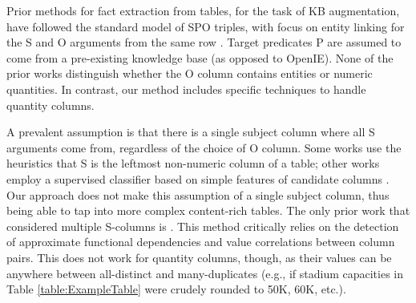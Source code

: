 %
Prior methods for fact extraction from tables, for the
task of KB augmentation, have followed
the standard model of SPO triples, with focus on entity linking
for the S and O arguments from the same row \cite{DBLP:conf/kdd/0001GHHLMSSZ14, DBLP:conf/wims/RitzeLB15, DBLP:conf/edbt/RitzeB17, 
DBLP:conf/edbt/OulabiB19, DBLP:conf/www/FetahuAK19,DBLP:conf/semweb/KruitBU19}.
Target predicates P are 
assumed to come from a pre-existing
knowledge base
(as opposed to OpenIE).
None of the prior works distinguish whether the O column contains
entities or numeric quantities.
In contrast, our method includes specific techniques to handle 
quantity columns.
%

A prevalent assumption is that there is a single subject column
where all S arguments come from, regardless of the choice of O column.
Some works use the heuristics that S is the leftmost
non-numeric column of a table;
other works employ a supervised classifier based on simple features of
candidate columns \cite{DBLP:journals/pvldb/VenetisHMPSWMW11,DBLP:journals/pvldb/DengJLLY13}.
Our approach does not make this assumption of a single subject column,
thus being able to tap into more complex 
content-rich tables.
The only prior work that considered multiple S-columns is \cite{DBLP:conf/er/BraunschweigTL15}.
This method critically relies on the detection of
approximate functional dependencies and value correlations between column pairs.
This does not work for quantity columns, though,
as their values can be anywhere between all-distinct
and many-duplicates (e.g., if stadium capacities in Table \ref{table:ExampleTable} were crudely rounded to 50K, 60K, etc.).
%






\vspace{0.1cm}

